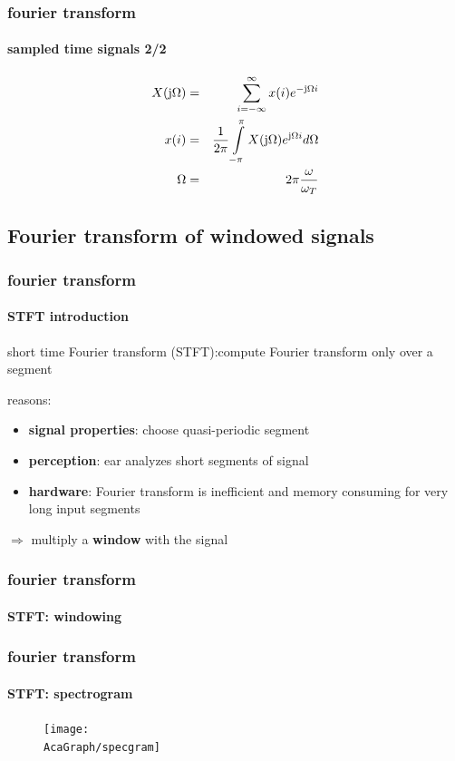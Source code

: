 	\begin{frame}\frametitle{fourier transform}\framesubtitle{sampled time signals 2/2}
        \begin{eqnarray*}
            X(\mathrm{j}\Omega) &=& \sum\limits_{i=-\infty}^{\infty} x(i)e^{-\mathrm{j}\Omega i}\\
            x(i) &=& \frac{1}{2\pi}\int\limits_{-\pi}^{\pi}X(\mathrm{j}\Omega)e^{\mathrm{j}\Omega i} d\Omega\\
            \Omega &=& 2\pi\frac{\omega}{\omega_T}
        \end{eqnarray*}
	\end{frame}	

\subsection{Fourier transform of windowed signals}
	\begin{frame}\frametitle{fourier transform}\framesubtitle{STFT introduction}
		short time Fourier transform (STFT):\linebreak compute Fourier transform only over a segment

		\vspace{3mm}		
		\pause
		reasons:
		\begin{itemize}
			\item	\textbf{signal properties}: choose quasi-periodic segment
			\item	\textbf{perception}: ear analyzes short segments of signal
			\item	\textbf{hardware}: Fourier transform is inefficient and memory consuming for very long input segments
		\end{itemize}
		\pause
		$\Rightarrow$ multiply a \textbf{window} with the signal
	\end{frame}	

	\begin{frame}\frametitle{fourier transform}\framesubtitle{STFT: windowing}
        \begin{center}
        \end{center}
	\end{frame}	
    
	\begin{frame}\frametitle{fourier transform}\framesubtitle{STFT: spectrogram}
		\begin{figure}
			\centering
				\texttt{[image: \\AcaGraph/specgram]}
		\end{figure}
	\end{frame}	

